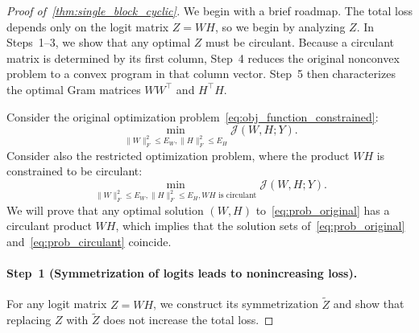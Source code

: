 \documentclass[11pt]{article}
\begin{document}
\begin{proof}[Proof of~\cref{thm:single_block_cyclic}] 
We begin with a brief roadmap.
The total loss depends only on the logit matrix \(Z=WH\), so we begin by analyzing \(Z\).
In Steps~1--3, we show that any optimal \(Z\) must be circulant.
Because a circulant matrix is determined by its first column, Step~4 reduces the original nonconvex problem to a convex program in that column vector.
Step~5 then characterizes the optimal Gram matrices \(WW^\top\) and \(H^\top H\).

Consider the original optimization problem~\cref{eq:obj_function_constrained}:
\begin{equation} \label{eq:prob_original}
\min_{\|W\|_F^2 \le E_W, \|H\|_F^2 \le E_H} \mathcal J(W,H;Y).
\end{equation}
Consider also the restricted optimization problem, where the product \(WH\) is constrained to be circulant:
\begin{equation} \label{eq:prob_circulant}
\min_{\|W\|_F^2 \le E_W, \|H\|_F^2 \le E_H,   WH \text{ is circulant}} \mathcal J(W,H;Y).
\end{equation}
We will prove that any optimal solution \((W,H)\) to~\cref{eq:prob_original} has a circulant product \(WH\), which implies that the solution sets of~\cref{eq:prob_original} and~\cref{eq:prob_circulant} coincide.

\paragraph{Step~1 (Symmetrization of logits leads to nonincreasing loss).}
For any logit matrix $Z=WH$, we construct its symmetrization $\widetilde{Z}$ and show that replacing $Z$ with $\widetilde{Z}$ does not increase the total loss.


\end{proof}
\end{document}
